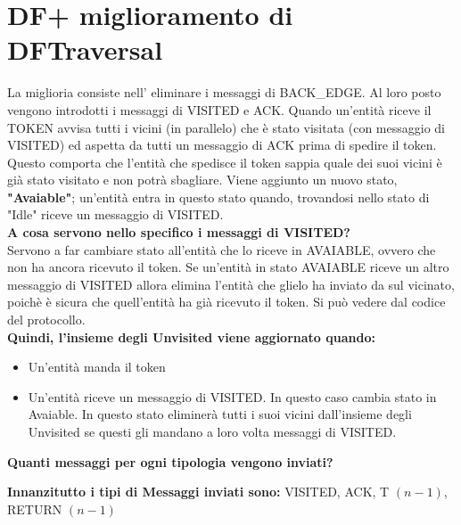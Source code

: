 \section{DF+ miglioramento di DFTraversal}
La miglioria consiste nell' eliminare i messaggi di BACK\_EDGE. Al loro posto
vengono introdotti i messaggi di VISITED e ACK. Quando un'entità riceve il TOKEN
avvisa tutti i vicini (in parallelo) che è stato visitata (con messaggio di
VISITED) ed aspetta da tutti un messaggio di ACK prima di spedire il token.
Questo comporta che l'entità che spedisce il token sappia quale dei suoi vicini
è già stato visitato e non potrà sbagliare. Viene aggiunto un nuovo stato,
\textbf{"Avaiable"}; un'entità entra in questo stato quando, trovandosi nello
stato di "Idle" riceve un messaggio di VISITED.\\

\textbf{A cosa servono nello specifico i messaggi di VISITED?}\\
Servono a far cambiare stato all'entità che lo riceve in AVAIABLE, ovvero che
non ha ancora ricevuto il token. Se un'entità in stato AVAIABLE riceve un altro
messaggio di VISITED allora elimina l'entità che glielo ha inviato da sul
vicinato, poichè è sicura che quell'entità ha già ricevuto il token. Si può
vedere dal codice del protocollo.\\
\textbf{Quindi, l'insieme degli Unvisited viene aggiornato quando:}
\begin{itemize}
    \item Un'entità manda il token
    \item Un'entità riceve un messaggio di VISITED. In questo caso cambia stato in
          Avaiable. In questo stato eliminerà tutti i suoi vicini dall'insieme degli
          Unvisited se questi gli mandano a loro volta messaggi di VISITED.
\end{itemize}

\textbf{Quanti messaggi per ogni tipologia vengono inviati?}

\textbf{Innanzitutto i tipi di Messaggi inviati sono:} VISITED, ACK, T $(n-1)$,
RETURN $(n-1)$

